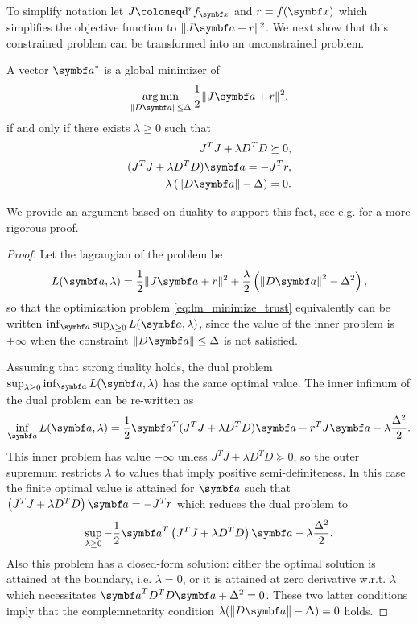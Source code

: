 To simplify notation let $J \coloneq \mathrm{d}^r f_\x$ and $r = f(\x)$ which simplifies the objective function to $\| J \a + r \|^2$. We next show that this constrained problem can be transformed into an unconstrained problem.
\begin{theorem}
  \label{thm:lm}
  A vector $\a^*$ is a global minimizer of
  \begin{equation}
    \argmin_{\| D \a \| \leq \Delta} \frac{1}{2} \| J \a + r \|^2.
  \end{equation}
  if and only if there exists $\lambda \geq 0$ such that
  \begin{subequations}
    \begin{align}
      J^T J + \lambda D^T D \succeq 0,                              \\
      (J^T J + \lambda D^T D) \a = -J^T r,  \label{eq:lm_normaleqs} \\
      \lambda \left( \left\| D \a \right\| - \Delta \right)=0.
    \end{align}
  \end{subequations}
\end{theorem}
We provide an argument based on duality to support this fact, see e.g. \cite[Theorem 4.1]{nocedal_numerical_2006} for a more rigorous proof.
\begin{proof}
  Let the lagrangian of the problem be
  \begin{equation}
    L(\a, \lambda) = \frac{1}{2} \| J \a + r \|^2 + \frac{\lambda}{2} \left( \left\| D \a \right\|^2 - \Delta^2 \right),
  \end{equation}
  so that the optimization problem \eqref{eq:lm_minimize_trust} equivalently can be written $\inf_{\a} \sup_{\lambda \geq 0} L(\a, \lambda)$, since the value of the inner problem is $+\infty$ when the constraint $\| D \a \| \leq \Delta$ is not satisfied.

  Assuming that strong duality holds, the dual problem $\sup_{\lambda \geq 0} \inf_{\a} L(\a, \lambda)$ has the same optimal value. The inner infimum of the dual problem can be re-written as
  \begin{equation}
    \inf_{\a} L(\a, \lambda) = \frac{1}{2} \a^T ( J^T J + \lambda D^T D ) \a + r^T J \a - \lambda \frac{\Delta^2}{2}.
  \end{equation}
  This inner problem has value $-\infty$ unless $J^T J + \lambda D^T D \succeq 0$, so the outer supremum restricts $\lambda$ to values that imply positive semi-definiteness. In this case the finite optimal value is attained for $\a$ such that $\left(J^T J + \lambda D^T D \right) \a = -J^T r$ which reduces the dual problem to
  \begin{equation}
    \sup_{\lambda \geq 0} -\frac{1}{2} \a^T \left( J^T J + \lambda D^T D \right) \a - \lambda \frac{\Delta^2}{2}.
  \end{equation}
  Also this problem has a closed-form solution: either the optimal solution is attained at the boundary, i.e. $\lambda = 0$, or it is attained at zero derivative w.r.t. $\lambda$ which necessitates $\a^T D^T D \a + \Delta^2 = 0$. These two latter conditions imply that the complemnetarity condition $\lambda (\| D \a \| - \Delta) = 0$ holds.
\end{proof}

